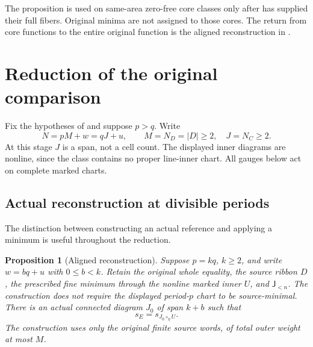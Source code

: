 \documentclass[11pt,a4paper]{amsart}
\numberwithin{equation}{section}
\theoremstyle{plain}
\newtheorem{proposition}[theorem]{Proposition}
\theoremstyle{definition}
\newcommand{\Jlower}{\mathsf J_{<n}}
\begin{document}
The proposition is used on same-area zero-free core classes only after
 has supplied their full fibers.  Original minima are not
assigned to those cores.  The return from core functions to the entire
original function is the aligned reconstruction in .


\section{Reduction of the original comparison}\label{sec:reduction}

Fix the hypotheses of  and suppose \(p>q\).  Write
\[
 N=pM+w=qJ+u,\qquad M=N_D=|D|\ge2,\quad J=N_C\ge2.
\]
At this stage \(J\) is a span, not a cell count.  The displayed inner diagrams
are nonline, since the class contains no proper line-inner chart.  All gauges
below act on complete marked charts.

\subsection{Actual reconstruction at divisible periods}

The distinction between constructing an actual reference and applying a
minimum is useful throughout the reduction.

\begin{proposition}[Aligned reconstruction]\label{prop:aligned-reconstruction}
Suppose \(p=kq\), \(k\ge2\), and write \(w=bq+u\) with \(0\le b<k\).
Retain the original whole equality, the source ribbon \(D\), the prescribed
fine minimum through the nonline marked inner \(U\), and \(\Jlower\).
The construction does not require the displayed period-\(p\) chart to be
source-minimal.  There is an actual connected diagram \(J_0\) of span \(k+b\)
such that
\begin{equation}\label{eq:aligned-reference}
 s_E=s_{J_0\circ_\eta U}.
\end{equation}
The construction uses only the original finite source words, of total
outer weight at most \(M\).
\end{proposition}
\end{document}
